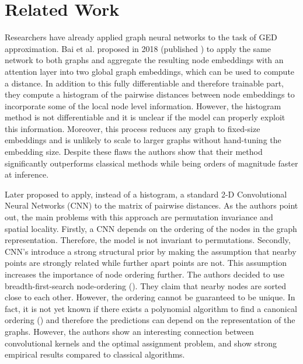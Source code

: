 \section{Related Work}
\label{section:related_work}

Researchers have already applied graph neural networks to the task of GED approximation. Bai et al. proposed in 2018 (published \citealp{bai2019}) to apply the same network to both graphs and aggregate the resulting node embeddings with an attention layer into two global graph embeddings, which can be used to compute a distance. In addition to this fully differentiable and therefore trainable part, they compute a histogram of the pairwise distances between node embeddings to incorporate some of the local node level information. However, the histogram method is not differentiable and it is unclear if the model can properly exploit this information. Moreover, this process reduces any graph to fixed-size embeddings and is unlikely to scale to larger graphs without hand-tuning the embedding size. Despite these flaws the authors show that their method significantly outperforms classical methods while being orders of magnitude faster at inference.

Later \cite{bai2018_cnn1} proposed to apply, instead of a histogram, a standard 2-D Convolutional Neural Networks (CNN) to the matrix of pairwise distances. As the authors point out, the main problems with this approach are permutation invariance and spatial locality. Firstly, a CNN depends on the ordering of the nodes in the graph representation. Therefore, the model is not invariant to permutations. Secondly, CNN's introduce a strong structural prior by making the assumption that nearby points are strongly related while further apart points are not. This assumption increases the importance of node ordering further. The authors decided to use breadth-first-search node-ordering (\citealp{bfs2018}). They claim that nearby nodes are sorted close to each other. However, the ordering cannot be guaranteed to be unique. In fact, it is not yet known if there exists a polynomial algorithm to find a canonical ordering (\citealp{canonical2016}) and therefore the predictions can depend on the representation of the graphs. However, the authors show an interesting connection between convolutional kernels and the optimal assignment problem, and show strong empirical results compared to classical algorithms.

